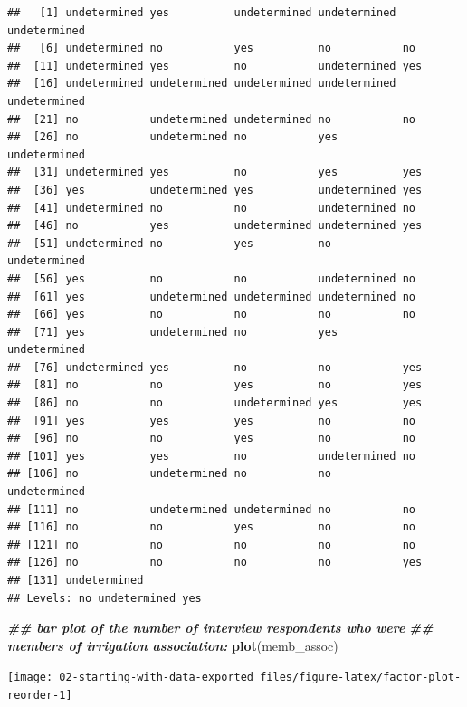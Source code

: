 \documentclass[
]{article}
\newenvironment{Shaded}{\begin{snugshade}}{\end{snugshade}}
\newcommand{\DocumentationTok}[1]{\textcolor[rgb]{0.56,0.35,0.01}{\textbf{\textit{#1}}}}
\newcommand{\FunctionTok}[1]{\textcolor[rgb]{0.13,0.29,0.53}{\textbf{#1}}}
\newcommand{\NormalTok}[1]{#1}
\begin{document}
\begin{verbatim}
##   [1] undetermined yes          undetermined undetermined undetermined
##   [6] undetermined no           yes          no           no          
##  [11] undetermined yes          no           undetermined yes         
##  [16] undetermined undetermined undetermined undetermined undetermined
##  [21] no           undetermined undetermined no           no          
##  [26] no           undetermined no           yes          undetermined
##  [31] undetermined yes          no           yes          yes         
##  [36] yes          undetermined yes          undetermined yes         
##  [41] undetermined no           no           undetermined no          
##  [46] no           yes          undetermined undetermined yes         
##  [51] undetermined no           yes          no           undetermined
##  [56] yes          no           no           undetermined no          
##  [61] yes          undetermined undetermined undetermined no          
##  [66] yes          no           no           no           no          
##  [71] yes          undetermined no           yes          undetermined
##  [76] undetermined yes          no           no           yes         
##  [81] no           no           yes          no           yes         
##  [86] no           no           undetermined yes          yes         
##  [91] yes          yes          yes          no           no          
##  [96] no           no           yes          no           no          
## [101] yes          yes          no           undetermined no          
## [106] no           undetermined no           no           undetermined
## [111] no           undetermined undetermined no           no          
## [116] no           no           yes          no           no          
## [121] no           no           no           no           no          
## [126] no           no           no           no           yes         
## [131] undetermined
## Levels: no undetermined yes
\end{verbatim}

\begin{Shaded}
\begin{Highlighting}[]
\DocumentationTok{\#\# bar plot of the number of interview respondents who were}
\DocumentationTok{\#\# members of irrigation association:}
\FunctionTok{plot}\NormalTok{(memb\_assoc)}
\end{Highlighting}
\end{Shaded}

\texttt{[image: 02-starting-with-data-exported\_files/figure-latex/factor-plot-reorder-1]}
\end{document}
